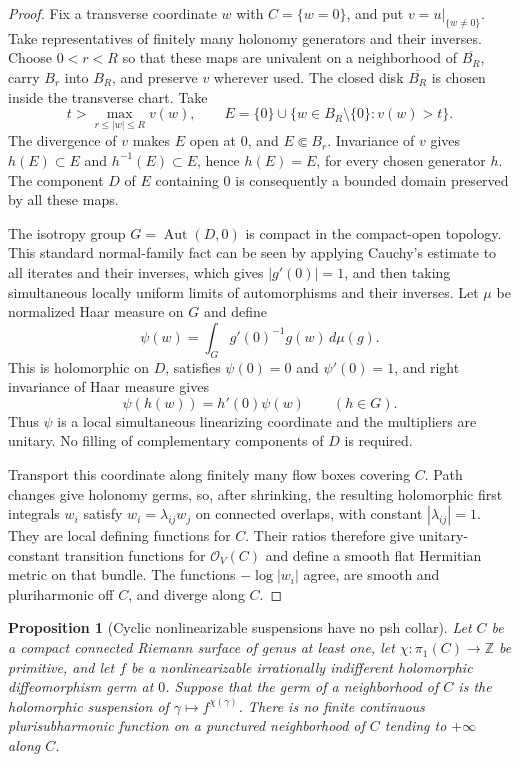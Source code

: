\documentclass[11pt]{amsart}
\newtheorem{proposition}[theorem]{Proposition}
\theoremstyle{definition}
\theoremstyle{remark}
\numberwithin{equation}{section}
\newcommand{\OO}{\mathcal O}
\begin{document}
\begin{proof}
Fix a transverse coordinate $w$ with $C=\{w=0\}$, and put $v=u|_{\{w\ne0\}}$.
Take representatives of finitely many holonomy generators and their inverses.
Choose $0<r<R$ so that these maps are univalent on a neighborhood of
$\overline{B_R}$, carry $B_r$ into $B_R$, and preserve $v$ wherever used.
The closed disk $\overline{B_R}$ is chosen inside the transverse chart.
Take
\[
 t>\max_{r\le |w|\le R}v(w),\qquad
 E=\{0\}\cup\{w\in B_R\setminus\{0\}:v(w)>t\}.
\]
The divergence of $v$ makes $E$ open at $0$, and $E\Subset B_r$.
Invariance of $v$ gives $h(E)\subset E$ and $h^{-1}(E)\subset E$, hence
$h(E)=E$, for every chosen generator $h$. The component $D$ of $E$
containing $0$ is consequently a bounded domain preserved by all these maps.

The isotropy group $G=\operatorname{Aut}(D,0)$ is compact in the compact-open
topology. This standard normal-family fact can be seen by applying Cauchy's
estimate to all iterates and their inverses, which gives $|g'(0)|=1$, and then
taking simultaneous locally uniform limits of automorphisms and their inverses.
Let $\mu$ be normalized Haar measure on $G$ and define
\[
 \psi(w)=\int_G g'(0)^{-1}g(w)\,d\mu(g).
\]
This is holomorphic on $D$, satisfies $\psi(0)=0$ and $\psi'(0)=1$, and
right invariance of Haar measure gives
\[
 \psi(h(w))=h'(0)\psi(w)\qquad(h\in G).
\]
Thus $\psi$ is a local simultaneous linearizing coordinate and the multipliers
are unitary. No filling of complementary components of $D$ is required.

Transport this coordinate along finitely many flow boxes covering $C$.
Path changes give holonomy germs, so, after shrinking, the resulting
holomorphic first integrals $w_i$ satisfy
$w_i=\lambda_{ij}w_j$ on connected overlaps, with constant
$|\lambda_{ij}|=1$. They are local defining functions for $C$.
Their ratios therefore give unitary-constant transition functions for
$\OO_V(C)$ and define a smooth flat Hermitian metric on that bundle.
The functions $-\log|w_i|$ agree, are smooth and pluriharmonic off $C$,
and diverge along $C$.
\end{proof}

\begin{proposition}[Cyclic nonlinearizable suspensions have no psh collar]
\label{prop:cyclic-suspension}
Let $C$ be a compact connected Riemann surface of genus at least one, let
$\chi:\pi_1(C)\to\mathbb Z$ be primitive, and let $f$ be a nonlinearizable
irrationally indifferent holomorphic diffeomorphism germ at $0$.
Suppose that the germ of a neighborhood of $C$ is the holomorphic suspension
of $\gamma\mapsto f^{\chi(\gamma)}$.
There is no finite continuous plurisubharmonic function on a punctured
neighborhood of $C$ tending to $+\infty$ along $C$.
\end{proposition}
\end{document}
